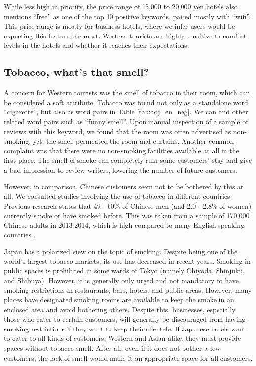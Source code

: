 \documentclass[smallextended,natbib]{svjour3}       %
\begin{document}
    While less high in priority, the price range of 15,000 to 20,000 yen hotels also mentions ``free'' as one of the top 10 positive keywords, paired mostly with ``wifi''. This price range is mostly for business hotels, where we infer users would be expecting this feature the most. Western tourists are highly sensitive to comfort levels in the hotels and whether it reaches their expectations.


  \subsection{Tobacco, what's that smell?}\label{disc:tobacco}

    A concern for Western tourists was the smell of tobacco in their room, which can be considered a soft attribute. Tobacco was found not only as a standalone word ``cigarette'', but also as word pairs in Table \ref{tab:adj_en_neg}. We can find other related word pairs such as ``funny smell''. Upon manual inspection of a sample of reviews with this keyword, we found that the room was often advertised as non-smoking, yet, the smell permeated the room and curtains. Another common complaint was that there were no non-smoking facilities available at all in the first place. The smell of smoke can completely ruin some customers’ stay and give a bad impression to review writers, lowering the number of future customers.

    However, in comparison, Chinese customers seem not to be bothered by this at all. We consulted studies involving the use of tobacco in different countries. Previous research states that 49 - 60\% of Chinese men (and 2.0 - 2.8\% of women) currently smoke or have smoked before. This was taken from a sample of 170,000 Chinese adults in 2013-2014, which is high compared to many English-speaking countries \cite[][]{zhang2019tobacco,who2015tobacco}.

    Japan has a polarized view on the topic of smoking. Despite being one of the world’s largest tobacco markets, its use has decreased in recent years. Smoking in public spaces is prohibited in some wards of Tokyo (namely Chiyoda, Shinjuku, and Shibuya). However, it is generally only urged and not mandatory to have smoking restrictions in restaurants, bars, hotels, and public areas. However, many places have designated smoking rooms are available to keep the smoke in an enclosed area and avoid bothering others. Despite this, businesses, especially those who cater to certain customers, will generally be discouraged from having smoking restrictions if they want to keep their clientele. If Japanese hotels want to cater to all kinds of customers, Western and Asian alike, they must provide spaces without tobacco smell. After all, even if it does not bother a few customers, the lack of smell would make it an appropriate space for all customers.
\end{document}

